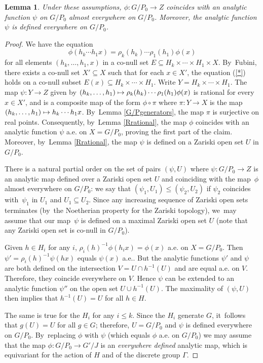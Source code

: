 \documentclass[JEP,XML,SOM,Unicode,published]{cedram}
\def\mto{\mathchoice{\longmapsto}{\mapsto}{\mapsto}{\mapsto}}
\newtheorem{lemma}{Lemma}
\theoremstyle{definition}
\let\G\Gamma
\begin{document}
\begin{lemma} \label{mapisnanlytic}
Under these assumptions, $\phi: G/P_0\to Z$ coincides with an analytic function $\psi $ on $G/P_0$ almost everywhere on $G/P_0$. Moreover, the analytic function $\psi$ is defined everywhere on $G/P_0$.
\end{lemma}

\begin{proof} We have the equation
\begin{equation} \label{*} \phi (h_k\cdots h_1x)=\rho_k(h_k)\cdots \rho_1(h_1)\phi (x)
\end{equation}
for all elements $(h_k,\dots,h_1,x)$ in a co-null set $E \subseteq H_k\times \cdots \times H_1 \times X$. By~Fubini, there exists a co-null set $X'\subseteq X$ such that for each $x\in X'$, the equation (\ref{*}) holds on a co-null subset $E(x) \subseteq H_k\times \cdots \times H_1$.
Write $Y=H_k\times \cdots \times H_1$. The map $\psi: Y \to Z$ given by $(h_k,\dots,h_1)\mto \rho_k(h_k)\cdots \rho_1(h_1)\phi (x)$ is rational for every $x\in X'$, and is a composite map of the form $\phi \circ \pi$ where $\pi :Y \to X$ is the map $(h_k,\dots, h_1)\mto h_k\cdots h_1 x$. By~Lemma \ref{G/Pgenerators}, the map $\pi$ is surjective on real points. Consequently, by~Lemma \ref{Rrational}, the map $\phi$ coincides with an analytic function $\psi $ a.e. on $X=G/P_0$, proving the first part of the claim. Moreover, by~Lemma \ref{Rrational}, the map $\psi$ is defined on a Zariski open set $U$ in $G/P_0$.

There is a natural partial order on the set of pairs $(\psi, U)$ where $\psi : G/P_0 \to Z$ is an analytic map defined over a Zariski open set $U$ and coinciding with the map~$\phi$ almost everywhere on $G/P_0$: we say that $(\psi_1,U_1)\leq (\psi_2, U_2)$ if $\psi_2$ coincides with~$\psi_1$ in $U_1$ and $U_1\subseteq U_2$. Since any increasing sequence of Zariski open sets terminates (by~the Noetherian property for the Zariski topology), we~may assume that our map~$\psi$ is defined on a maximal Zariski open set $U$ (note that any Zariski open set is co-null in $G/P_0$).

Given $h\in H_i$ for any $i$, $\rho_i (h)^{-1}\phi (h_ix)=\phi (x)$ a.e. on $X=G/P_0$. Then $\psi ' = \rho_i(h)^{-1}\psi (hx)$ equals $\psi (x)$ a.e.. But the analytic functions $\psi '$ and $\psi $ are both defined on the intersection $V= U\cap h^{-1}(U)$ and are equal a.e. on $V$. Therefore, they coincide everywhere on $V$. Hence $\psi $ can be extended to an analytic function $\psi ''$ on the open set $U \cup h^{-1}(U)$. The maximality of $(\psi, U)$ then implies that $h^{-1}(U)=U$ for all $h\in H$.

The same is true for the $H_i$ for any $i \leq k$. Since the $H_i$ generate $G$, it~follows that $g(U)=U$ for all $g\in G$; therefore, $U=G/P_0$ and $\psi $ is defined everywhere on $G/P_0$. By~replacing $\phi $ with $\psi$ (which equals $\phi$ a.e. on $G/P_0$) we may assume that the map $\phi :G/P_0 \to G'/J$ is an \emph{everywhere defined} analytic map, which is equivariant for the action of $H$ and of the discrete group $\G$.
\end{proof}
\end{document}
